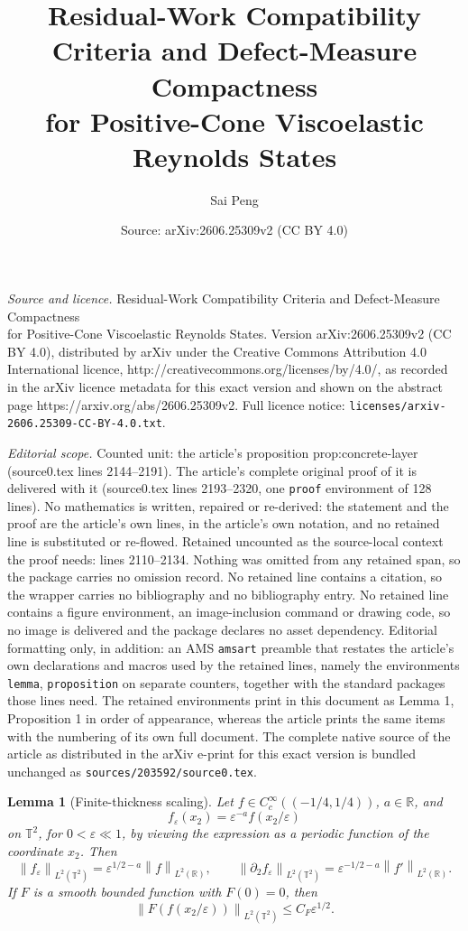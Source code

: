 \documentclass[10pt,a4paper]{amsart}
\title{Residual-Work Compatibility Criteria and Defect-Measure Compactness\\ for Positive-Cone Viscoelastic Reynolds States}
\author{Sai Peng}
\date{Source: arXiv:2606.25309v2 (CC BY 4.0)}
\newtheorem{lemma}{Lemma}
\newcommand{\R}{\mathbb R}
\newcommand{\T}{\mathbb T}
\newcommand{\eps}{\varepsilon}
\newcommand{\norm}[1]{\left\lVert #1\right\rVert}
\begin{document}
\maketitle

\noindent\emph{Source and licence.} Residual-Work Compatibility Criteria and Defect-Measure Compactness\\ for Positive-Cone Viscoelastic Reynolds States. Version arXiv:2606.25309v2 (CC BY 4.0), distributed by arXiv under the Creative Commons Attribution 4.0 International licence, http://creativecommons.org/licenses/by/4.0/, as recorded in the arXiv licence metadata for this exact version and shown on the abstract page https://arxiv.org/abs/2606.25309v2. Full licence notice: \texttt{licenses/arxiv-2606.25309-CC-BY-4.0.txt}.\par\smallskip

\noindent\textit{Editorial scope.} Counted unit: the article's proposition prop:concrete-layer (source0.tex lines 2144--2191). The article's complete original proof of it is delivered with it (source0.tex lines 2193--2320, one \texttt{proof} environment of 128 lines). No mathematics is written, repaired or re-derived: the statement and the proof are the article's own lines, in the article's own notation, and no retained line is substituted or re-flowed.  Retained uncounted as the source-local context the proof needs: lines 2110--2134.  Nothing was omitted from any retained span, so the package carries no omission record.  No retained line contains a citation, so the wrapper carries no bibliography and no bibliography entry.  No retained line contains a figure environment, an image-inclusion command or drawing code, so no image is delivered and the package declares no asset dependency.  Editorial formatting only, in addition: an AMS \texttt{amsart} preamble that restates the article's own declarations and macros used by the retained lines, namely the environments \texttt{lemma}, \texttt{proposition} on separate counters, together with the standard packages those lines need.  The retained environments print in this document as Lemma 1, Proposition 1 in order of appearance, whereas the article prints the same items with the numbering of its own full document.  The complete native source of the article as distributed in the arXiv e-print for this exact version is bundled unchanged as \texttt{sources/203592/source0.tex}.
\begin{lemma}[Finite-thickness scaling]
\label{lem:finite-thickness-scaling}
Let \(f\in C_c^\infty((-1/4,1/4))\), \(a\in\R\), and
\[
  f_\eps(x_2)=\eps^{-a}f(x_2/\eps)
\]
on \(\T^2\), for \(0<\eps\ll1\), by viewing the expression as a periodic
function of the coordinate \(x_2\).  Then
\[
  \norm{f_\eps}_{L^2(\T^2)}
  =
  \eps^{1/2-a}\norm{f}_{L^2(\R)},
  \qquad
  \norm{\partial_2 f_\eps}_{L^2(\T^2)}
  =
  \eps^{-1/2-a}\norm{f'}_{L^2(\R)}.
  \label{eq:finite-thickness-scale}
\]
If \(F\) is a smooth bounded function with \(F(0)=0\), then
\[
  \norm{F(f(x_2/\eps))}_{L^2(\T^2)}
  \le C_F\eps^{1/2}.
  \label{eq:bounded-layer-scale}
\]
\end{lemma}
\end{document}
